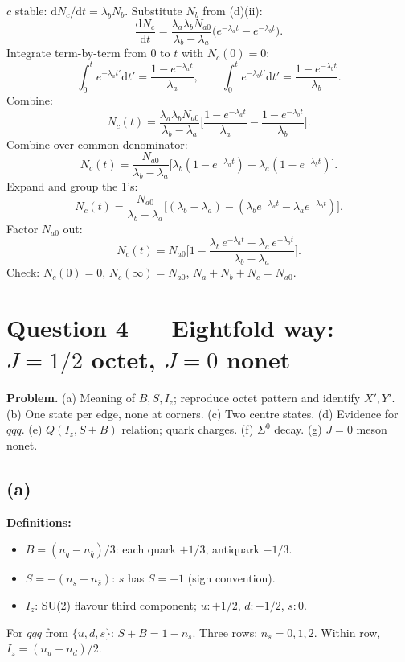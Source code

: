 \documentclass[11pt]{article}
\newcommand{\de}{\mathrm{d}}
\begin{document}
$c$ stable: $\de N_c/\de t = \lambda_b N_b$. Substitute $N_b$ from (d)(ii):
\[ \frac{\de N_c}{\de t} = \frac{\lambda_a \lambda_b N_{a0}}{\lambda_b - \lambda_a}\bigl(e^{-\lambda_a t} - e^{-\lambda_b t}\bigr). \]
Integrate term-by-term from $0$ to $t$ with $N_c(0)=0$:
\[ \int_0^t e^{-\lambda_a t'}\de t' = \frac{1-e^{-\lambda_a t}}{\lambda_a},\qquad \int_0^t e^{-\lambda_b t'}\de t' = \frac{1-e^{-\lambda_b t}}{\lambda_b}. \]
Combine:
\[ N_c(t) = \frac{\lambda_a \lambda_b N_{a0}}{\lambda_b - \lambda_a}\Big[\frac{1-e^{-\lambda_a t}}{\lambda_a} - \frac{1-e^{-\lambda_b t}}{\lambda_b}\Big]. \]
Combine over common denominator:
\[ N_c(t) = \frac{N_{a0}}{\lambda_b - \lambda_a}\bigl[\lambda_b(1-e^{-\lambda_a t}) - \lambda_a (1-e^{-\lambda_b t})\bigr]. \]
Expand and group the $1$'s:
\[ N_c(t) = \frac{N_{a0}}{\lambda_b - \lambda_a}\bigl[(\lambda_b - \lambda_a) - (\lambda_b e^{-\lambda_a t} - \lambda_a e^{-\lambda_b t})\bigr]. \]
Factor $N_{a0}$ out:
\[ \boxed{\;N_c(t) = N_{a0}\Big[1 - \frac{\lambda_b\,e^{-\lambda_a t} - \lambda_a\,e^{-\lambda_b t}}{\lambda_b - \lambda_a}\Big].\;} \]
Check: $N_c(0)=0$, $N_c(\infty)=N_{a0}$, $N_a + N_b + N_c = N_{a0}$.

\section*{Question 4 --- Eightfold way: $J=1/2$ octet, $J=0$ nonet}

\textbf{Problem.} (a) Meaning of $B,S,I_z$; reproduce octet pattern and identify $X',Y'$. (b) One state per edge, none at corners. (c) Two centre states. (d) Evidence for $qqq$. (e) $Q(I_z, S+B)$ relation; quark charges. (f) $\Sigma^0$ decay. (g) $J=0$ meson nonet.

\subsection*{(a)}

\textbf{Definitions:}
\begin{itemize}
\item $B = (n_q - n_{\bar q})/3$: each quark $+1/3$, antiquark $-1/3$.
\item $S = -(n_s - n_{\bar s})$: $s$ has $S=-1$ (sign convention).
\item $I_z$: SU(2) flavour third component; $u: +1/2$, $d: -1/2$, $s: 0$.
\end{itemize}
For $qqq$ from $\{u,d,s\}$: $S+B = 1 - n_s$. Three rows: $n_s=0,1,2$. Within row, $I_z = (n_u - n_d)/2$.
\end{document}
